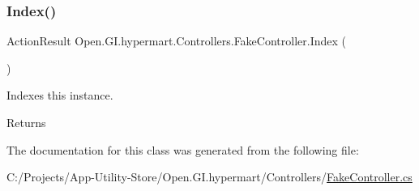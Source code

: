 \subsubsection{\texorpdfstring{Index()}{Index()}}
{\footnotesize\ttfamily Action\+Result Open.\+G\+I.\+hypermart.\+Controllers.\+Fake\+Controller.\+Index (\begin{DoxyParamCaption}{ }\end{DoxyParamCaption})}



Indexes this instance. 

\begin{DoxyReturn}{Returns}

\end{DoxyReturn}


The documentation for this class was generated from the following file\+:\begin{DoxyCompactItemize}
\item 
C\+:/\+Projects/\+App-\/\+Utility-\/\+Store/\+Open.\+G\+I.\+hypermart/\+Controllers/\hyperlink{_fake_controller_8cs}{Fake\+Controller.\+cs}\end{DoxyCompactItemize}
